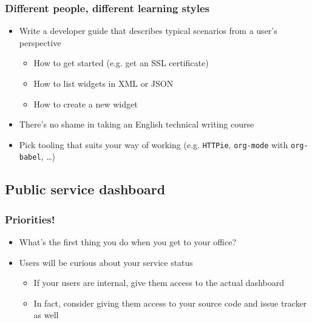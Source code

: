 \documentclass[8pt]{article}
\begin{document}
\subsubsection{Different people, different learning styles}
\label{sec:org728c0f1}
\begin{itemize}
\item Write a developer guide that describes typical scenarios from a user's perspective
\begin{itemize}
\item How to get started (e.g. get an SSL certificate)
\item How to list widgets in XML or JSON
\item How to create a new widget
\end{itemize}
\item There's no shame in taking an English technical writing course
\item Pick tooling that suits your way of working (e.g. \texttt{HTTPie}, \texttt{org-mode} with \texttt{org-babel}, \ldots{})
\end{itemize}
\subsection{Public service dashboard}
\label{sec:org7cf7937}
\subsubsection{Priorities!}
\label{sec:org9d46052}
\begin{itemize}
\item What's the first thing you do when you get to your office?

\item Users will be curious about your service status
\begin{itemize}
\item If your users are internal, give them access to the actual dashboard
\item In fact, consider giving them access to your source code and issue tracker as well
\end{itemize}
\end{itemize}
\end{document}
